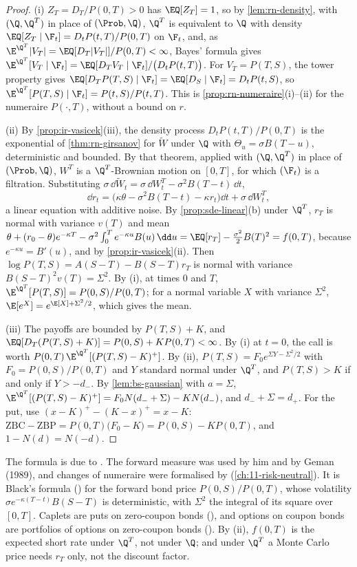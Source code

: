 \begin{proof}
(i) $Z_T=D_T/P(0,T)>0$ has $\EQ[Z_T]=1$, so by \cref{lem:rn-density}, with $(\Q,\Q^T)$ in place of
$(\Prob,\Q)$, $\Q^T$ is equivalent to $\Q$ with density $\EQ[Z_T\mid\F_t]=D_tP(t,T)/P(0,T)$ on $\F_t$,
and, as $\E^{\Q^T}|V_T|=\EQ[D_T|V_T|]/P(0,T)<\infty$, Bayes' formula gives
$\E^{\Q^T}[V_T\mid\F_t]=\EQ[D_TV_T\mid\F_t]/\big(D_tP(t,T)\big)$. For $V_T=P(T,S)$, the tower property gives
$\EQ[D_TP(T,S)\mid\F_t]=\EQ[D_S\mid\F_t]=D_tP(t,S)$, so $\E^{\Q^T}[P(T,S)\mid\F_t]=P(t,S)/P(t,T)$. This is
\cref{prop:rn-numeraire}(i)--(ii) for the numeraire $P(\cdot,T)$, without a bound on $r$.

(ii) By \cref{prop:ir-vasicek}(iii), the density process $D_tP(t,T)/P(0,T)$ is the exponential of
\cref{thm:rn-girsanov} for $\widetilde W$ under $\Q$ with $\Theta_u=\sigma B(T-u)$, deterministic and
bounded. By that theorem, applied with $(\Q,\Q^T)$ in place of $(\Prob,\Q)$, $W^T$ is a
$\Q^T$-Brownian motion on $[0,T]$, for which $(\F_t)$ is a filtration. Substituting
$\sigma\,\dd\widetilde W_t=\sigma\,\dd W^T_t-\sigma^2B(T-t)\,\dd t$,
\[
  \dd r_t=\big(\kappa\theta-\sigma^2B(T-t)-\kappa r_t\big)\dd t+\sigma\,\dd W^T_t ,
\]
a linear equation with additive noise. By \cref{prop:sde-linear}(b) under $\Q^T$, $r_T$ is normal
with variance $v(T)$ and mean
$\theta+(r_0-\theta)e^{-\kappa T}-\sigma^2\int_0^Te^{-\kappa u}B(u)\,\dd u=\EQ[r_T]-\frac{\sigma^2}2B(T)^2=f(0,T)$,
because $e^{-\kappa u}=B'(u)$, and by \cref{prop:ir-vasicek}(ii). Then
$\log P(T,S)=A(S-T)-B(S-T)r_T$ is normal with variance $B(S-T)^2v(T)=\Sigma^2$. By (i), at times $0$
and $T$, $\E^{\Q^T}[P(T,S)]=P(0,S)/P(0,T)$; for a normal variable $X$ with variance $\Sigma^2$,
$\E[e^X]=e^{\E[X]+\Sigma^2/2}$, which gives the mean.

(iii) The payoffs are bounded by $P(T,S)+K$, and $\EQ[D_T(P(T,S)+K)]=P(0,S)+KP(0,T)<\infty$. By (i)
at $t=0$, the call is worth $P(0,T)\,\E^{\Q^T}[(P(T,S)-K)^+]$. By (ii),
$P(T,S)=F_0e^{\Sigma Y-\Sigma^2/2}$ with $F_0=P(0,S)/P(0,T)$ and $Y$ standard normal under $\Q^T$, and
$P(T,S)>K$ if and only if $Y>-d_-$. By \cref{lem:bs-gaussian} with $a=\Sigma$,
$\E^{\Q^T}[(P(T,S)-K)^+]=F_0N(d_-+\Sigma)-KN(d_-)$, and $d_-+\Sigma=d_+$. For the put, use
$(x-K)^+-(K-x)^+=x-K$: $\mathrm{ZBC}-\mathrm{ZBP}=P(0,T)\big(F_0-K\big)=P(0,S)-KP(0,T)$, and
$1-N(d)=N(-d)$.
\end{proof}

The formula is due to \textcite{jamshidian-bond-option}. The forward measure was used by him and
by Geman (1989), and changes of numeraire were formalised by \textcite{geman-elkaroui-rochet-1995}
(\cref{ch:11-risk-neutral}). It is Black's formula () for the forward bond
price $P(0,S)/P(0,T)$, whose volatility $\sigma e^{-\kappa(T-t)}B(S-T)$ is deterministic, with $\Sigma^2$
the integral of its square over $[0,T]$. Caplets are puts on zero-coupon bonds
(), and options on coupon bonds are portfolios of options on zero-coupon bonds
(). By (ii), $f(0,T)$ is the expected short rate under $\Q^T$, not under $\Q$;
and under $\Q^T$ a Monte Carlo price needs $r_T$ only, not the discount factor.

